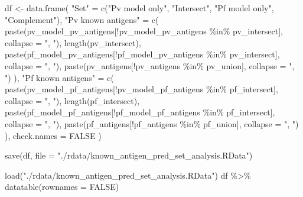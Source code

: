 \documentclass[
  11pt,
  oneside]{book}
\newenvironment{Shaded}{\begin{snugshade}}{\end{snugshade}}
\newcommand{\AttributeTok}[1]{\textcolor[rgb]{0.77,0.63,0.00}{#1}}
\newcommand{\ConstantTok}[1]{\textcolor[rgb]{0.00,0.00,0.00}{#1}}
\newcommand{\FunctionTok}[1]{\textcolor[rgb]{0.00,0.00,0.00}{#1}}
\newcommand{\NormalTok}[1]{#1}
\newcommand{\OtherTok}[1]{\textcolor[rgb]{0.56,0.35,0.01}{#1}}
\newcommand{\SpecialCharTok}[1]{\textcolor[rgb]{0.00,0.00,0.00}{#1}}
\newcommand{\StringTok}[1]{\textcolor[rgb]{0.31,0.60,0.02}{#1}}
\begin{document}
\begin{Shaded}
\begin{Highlighting}[]
\NormalTok{df }\OtherTok{\textless{}{-}} \FunctionTok{data.frame}\NormalTok{(}
  \StringTok{"Set"} \OtherTok{=} \FunctionTok{c}\NormalTok{(}\StringTok{"Pv model only"}\NormalTok{, }\StringTok{"Intersect"}\NormalTok{, }\StringTok{"Pf model only"}\NormalTok{, }\StringTok{"Complement"}\NormalTok{),}
  \StringTok{"Pv known antigens"} \OtherTok{=} \FunctionTok{c}\NormalTok{(}
    \FunctionTok{paste}\NormalTok{(pv\_model\_pv\_antigens[}\SpecialCharTok{!}\NormalTok{pv\_model\_pv\_antigens }\SpecialCharTok{\%in\%}\NormalTok{ pv\_intersect], }\AttributeTok{collapse =} \StringTok{", "}\NormalTok{),}
    \FunctionTok{length}\NormalTok{(pv\_intersect),}
    \FunctionTok{paste}\NormalTok{(pf\_model\_pv\_antigens[}\SpecialCharTok{!}\NormalTok{pf\_model\_pv\_antigens }\SpecialCharTok{\%in\%}\NormalTok{ pv\_intersect], }\AttributeTok{collapse =} \StringTok{", "}\NormalTok{),}
    \FunctionTok{paste}\NormalTok{(pv\_antigens[}\SpecialCharTok{!}\NormalTok{pv\_antigens }\SpecialCharTok{\%in\%}\NormalTok{ pv\_union], }\AttributeTok{collapse =} \StringTok{", "}\NormalTok{)}
\NormalTok{  ),}
  \StringTok{"Pf known antigens"} \OtherTok{=} \FunctionTok{c}\NormalTok{(}
    \FunctionTok{paste}\NormalTok{(pv\_model\_pf\_antigens[}\SpecialCharTok{!}\NormalTok{pv\_model\_pf\_antigens }\SpecialCharTok{\%in\%}\NormalTok{ pf\_intersect], }\AttributeTok{collapse =} \StringTok{", "}\NormalTok{),}
    \FunctionTok{length}\NormalTok{(pf\_intersect),}
    \FunctionTok{paste}\NormalTok{(pf\_model\_pf\_antigens[}\SpecialCharTok{!}\NormalTok{pf\_model\_pf\_antigens }\SpecialCharTok{\%in\%}\NormalTok{ pf\_intersect], }\AttributeTok{collapse =} \StringTok{", "}\NormalTok{),}
    \FunctionTok{paste}\NormalTok{(pf\_antigens[}\SpecialCharTok{!}\NormalTok{pf\_antigens }\SpecialCharTok{\%in\%}\NormalTok{ pf\_union], }\AttributeTok{collapse =} \StringTok{", "}\NormalTok{)}
\NormalTok{  ),}
  \AttributeTok{check.names =} \ConstantTok{FALSE}
\NormalTok{)}

\FunctionTok{save}\NormalTok{(df, }\AttributeTok{file =} \StringTok{"./rdata/known\_antigen\_pred\_set\_analysis.RData"}\NormalTok{)}
\end{Highlighting}
\end{Shaded}

\begin{Shaded}
\begin{Highlighting}[]
\FunctionTok{load}\NormalTok{(}\StringTok{"./rdata/known\_antigen\_pred\_set\_analysis.RData"}\NormalTok{)}
\NormalTok{df }\SpecialCharTok{\%\textgreater{}\%}
  \FunctionTok{datatable}\NormalTok{(}\AttributeTok{rownames =} \ConstantTok{FALSE}\NormalTok{)}
\end{Highlighting}
\end{Shaded}
\end{document}

